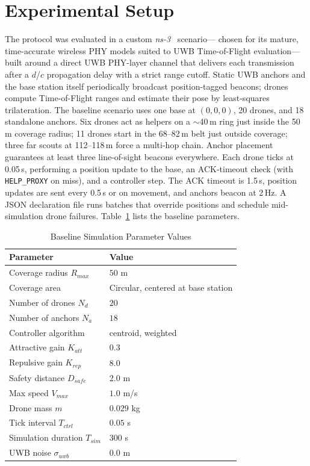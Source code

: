 \documentclass[conference]{IEEEtran}
\begin{document}
\section{Experimental Setup}
\label{sec:exp-setup}
The protocol was evaluated in a custom \textit{ns-3}~\cite{ns3simulator} scenario---
chosen for its mature, time-accurate wireless PHY models suited to UWB Time-of-Flight 
evaluation---built around a direct UWB PHY-layer channel that delivers each transmission 
after a $d$/$c$ propagation delay with a strict range cutoff. Static UWB anchors and 
the base station itself periodically broadcast position-tagged beacons; drones compute 
Time-of-Flight ranges and estimate their pose by least-squares trilateration. The baseline 
scenario uses one base at $(0,0,0)$, 20 drones, and 18 standalone anchors. Six drones 
act as helpers on a $\sim$40\,m ring just inside the 50\,m coverage radius; 11 drones start 
in the 68--82\,m belt just outside coverage; three far scouts at 112--118\,m force a multi-hop 
chain. Anchor placement guarantees at least three line-of-sight beacons everywhere. 
Each drone ticks at 0.05\,s, performing a position update to the base, an ACK-timeout check
(with \texttt{HELP\_PROXY} on miss), and a controller step. The ACK
timeout is 1.5\,s, position updates are sent every 0.5\,s or on movement,
and anchors beacon at 2\,Hz. A JSON declaration file runs batches that
override positions and schedule mid-simulation drone failures.
Table~\ref{tab:sim-values} lists the baseline parameters.

\begin{table}[t]
\caption{Baseline Simulation Parameter Values}
\label{tab:sim-values}
\centering
\begin{tabular}{|l|l|}
\hline
\textbf{Parameter} & \textbf{Value} \\ \hline
Coverage radius $R_{max}$ & $50$ m \\ \hline
Coverage area & Circular, centered at base station \\ \hline
Number of drones $N_d$ & $20$ \\ \hline
Number of anchors $N_a$ & $18$ \\ \hline
Controller algorithm & centroid, weighted \\ \hline
Attractive gain $K_{att}$ & $0.3$ \\ \hline
Repulsive gain $K_{rep}$ & $8.0$ \\ \hline
Safety distance $D_{safe}$ & $2.0$ m \\ \hline
Max speed $V_{max}$ & $1.0$ m/s \\ \hline
Drone mass $m$ & $0.029$ kg \\ \hline
Tick interval $T_{ctrl}$ & $0.05$ s \\ \hline
Simulation duration $T_{sim}$ & $300$ s \\ \hline
UWB noise $\sigma_{uwb}$ & $0.0$ m \\ \hline
\end{tabular}
\end{table}
\end{document}
